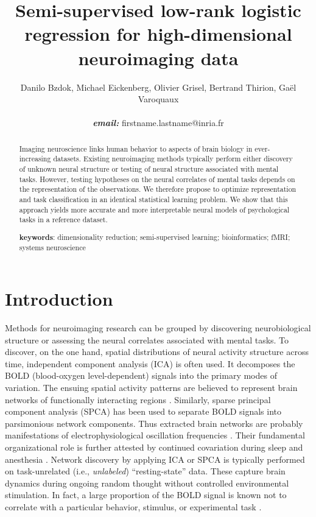 \documentclass{article} %
\title{Semi-supervised low-rank logistic regression for
high-dimensional neuroimaging data}
\begin{document}
\author{Danilo Bzdok, Michael Eickenberg, Olivier Grisel,
  Bertrand Thirion,
  Ga\"el Varoquaux \\\\\textbf{\textit{email:} }firstname.lastname@inria.fr}

\maketitle

\begin{abstract}
Imaging neuroscience links human behavior to aspects of brain
biology in ever-increasing datasets.
%
Existing neuroimaging methods typically perform either discovery of unknown
neural structure or testing of neural structure associated with mental tasks.
%
However, testing hypotheses on the neural correlates of mental tasks
depends on the representation of the observations.
%
We therefore propose to optimize
representation and task classification in
an identical statistical learning problem.
%
We show that this approach yields more accurate and more interpretable
neural models of psychological tasks in a reference dataset.
%

\textbf{keywords}: dimensionality reduction; semi-supervised learning;
bioinformatics; fMRI; systems neuroscience

\end{abstract}

\section{Introduction}
%
Methods for neuroimaging research can be grouped by discovering
neurobiological structure or assessing the neural correlates associated
with mental tasks.
To discover, on the one hand, spatial distributions of neural activity
structure across time,
independent component analysis (ICA) \cite{beckmann2005} is often used.
It decomposes the BOLD (blood-oxygen level-dependent) signals into the
primary modes of variation.
The ensuing spatial activity patterns are believed to represent
brain networks of
functionally interacting regions \cite{smith2009}.
Similarly, sparse principal component analysis (SPCA) \cite{varoqu2011}
has been used to
separate BOLD signals into parsimonious network components.
Thus extracted brain networks are probably
manifestations of electrophysiological oscillation frequencies \cite{hipp15}.
Their fundamental organizational role is further
attested by continued covariation during sleep and anesthesia \cite{fox07}.
%
Network discovery by applying ICA or SPCA is typically performed on
task-unrelated (i.e., \textit{unlabeled}) ``resting-state'' data.
These capture brain dynamics
during ongoing random thought without controlled environmental stimulation.
In fact, a large proportion of the BOLD signal is known
not to correlate with a particular behavior, stimulus, or experimental task
\cite{fox07}. 
\end{document}
